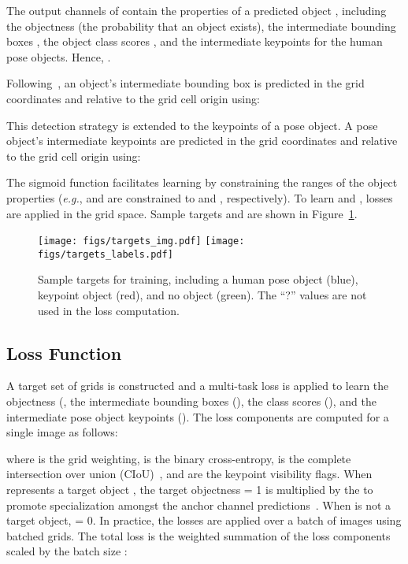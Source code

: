 \documentclass[runningheads]{llncs}
\newcommand{\eg}{\textit{e.g.}}
\newcommand\hlll[1]{\bgroup
  \hskip0pt\color{black}#1\egroup
}
\begin{document}
The  output channels of  contain the properties of a predicted object , including the objectness  (the probability that an object exists), the intermediate bounding boxes , the object class scores , and the intermediate keypoints  for the human pose objects. Hence, .

Following~\cite{glenn_jocher_2021_4679653, wang2020scaled}, an object's intermediate bounding box  is predicted in the grid coordinates and relative to the grid cell origin  using:


This detection strategy \hlll {is} extended to the keypoints of a pose object. A pose object's intermediate keypoints  are predicted in the grid coordinates and relative to the grid cell origin  using:

The sigmoid function  facilitates learning by constraining the ranges of the object properties (\eg,  and  are constrained to  and , respectively). To learn  and , losses are applied in the grid space. Sample targets  and  are shown in Figure~\ref{fig:kapao_targets}.

\begin{figure}[t!]
\centering
    \texttt{[image: figs/targets\_img.pdf]}
    \texttt{[image: figs/targets\_labels.pdf]}
\caption[Sample targets used for training KAPAO.]{Sample targets for training, including a human pose object (blue), keypoint object (red), and no object (green). The ``?'' values are not used in the loss computation.}
\label{fig:kapao_targets}
\end{figure}

\subsection{Loss Function}
\label{sec:kapao_loss}
A target set of grids  is constructed and a multi-task loss  is applied to learn the objectness  (, the intermediate bounding boxes  (), the class scores  (), and the intermediate pose object keypoints  (). The loss components are computed for a single image as follows:





where  is the grid weighting,  is the binary cross-entropy,  is the complete intersection over union (CIoU)~\cite{zheng2020distance}, and  are the keypoint visibility flags. When  represents a target object , the target objectness  = 1 is multiplied by the  to promote specialization amongst the anchor channel predictions~\cite{redmon2016you}. When  is not a target object,  = 0. In practice, the losses are applied over a batch of images using batched grids. The total loss  is the weighted summation of the loss components scaled by the batch size :
\end{document}
